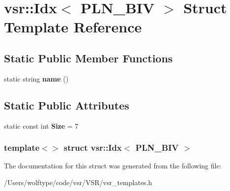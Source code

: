 \hypertarget{structvsr_1_1_idx_3_01_p_l_n___b_i_v_01_4}{\section{vsr\-:\-:Idx$<$ P\-L\-N\-\_\-\-B\-I\-V $>$ Struct Template Reference}
\label{structvsr_1_1_idx_3_01_p_l_n___b_i_v_01_4}
}
\subsection*{Static Public Member Functions}
\begin{DoxyCompactItemize}
\item 
\hypertarget{structvsr_1_1_idx_3_01_p_l_n___b_i_v_01_4_a724768941e5871740f1bedae464d2548}{static string {\bfseries name} ()}\label{structvsr_1_1_idx_3_01_p_l_n___b_i_v_01_4_a724768941e5871740f1bedae464d2548}

\end{DoxyCompactItemize}
\subsection*{Static Public Attributes}
\begin{DoxyCompactItemize}
\item 
\hypertarget{structvsr_1_1_idx_3_01_p_l_n___b_i_v_01_4_ae66d45b280b47a5ee3db9f1a6e2b84aa}{static const int {\bfseries Size} = 7}\label{structvsr_1_1_idx_3_01_p_l_n___b_i_v_01_4_ae66d45b280b47a5ee3db9f1a6e2b84aa}

\end{DoxyCompactItemize}
\subsubsection*{template$<$$>$ struct vsr\-::\-Idx$<$ P\-L\-N\-\_\-\-B\-I\-V $>$}



The documentation for this struct was generated from the following file\-:\begin{DoxyCompactItemize}
\item 
/\-Users/wolftype/code/vsr/\-V\-S\-R/vsr\-\_\-templates.\-h\end{DoxyCompactItemize}

